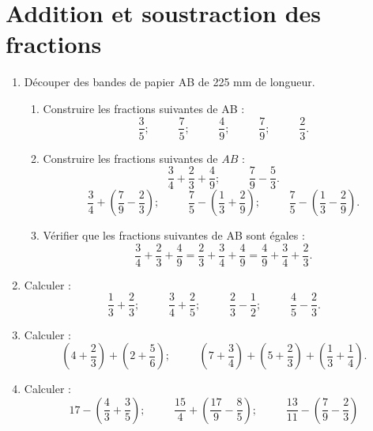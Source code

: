 
\chapter{Addition et soustraction des fractions}

\begin{enumerate}
\item Découper des bandes de papier AB de 225 mm de 
longueur. \begin{enumerate}
\item Construire les fractions suivantes de AB : 
\[ \frac35; \phantom{meow}\frac75; \phantom{meow}
\frac49; \phantom{meow}\frac79; \phantom{meow}\frac23.\]
\item Construire les fractions suivantes de $AB$ : 
\[\frac34+\frac23+\frac49; \phantom{meow}\frac79-\frac53.\]
\[\frac34+\left(\frac79-\frac23\right);  \phantom{meow} \frac75-\left(\frac13+\frac29\right);
 \phantom{meow}\frac75-\left(\frac13-\frac29\right).\]
 
 \item Vérifier que les fractions suivantes de AB sont égales : 
 \[\frac34+\frac23+\frac49 = \frac23+\frac34+\frac49 = \frac49 + \frac34 + \frac23.\]
 \end{enumerate}
 \item Calculer : 
 \[\frac13 + \frac23;  \phantom{meow}
 \frac34+\frac25; \phantom{meow}
 \frac23-\frac12;  \phantom{meow}
 \frac45-\frac23.\]
 \item Calculer : \[\left(4+\frac23\right) + \left(2+ \frac56\right);  \phantom{meow}
 \left(7 + \frac34\right) + \left(5 + \frac23\right)
 + \left(\frac13+\frac14\right).\]
 \item Calculer :\[ 17 - \left(\frac43 + \frac35\right) ;  \phantom{meow}
 \frac{15}4 + \left(\frac{17}9-\frac85\right); 
  \phantom{meow}
  \frac{13}{11} - \left(\frac79 - \frac23\right)\]


\end{enumerate}
